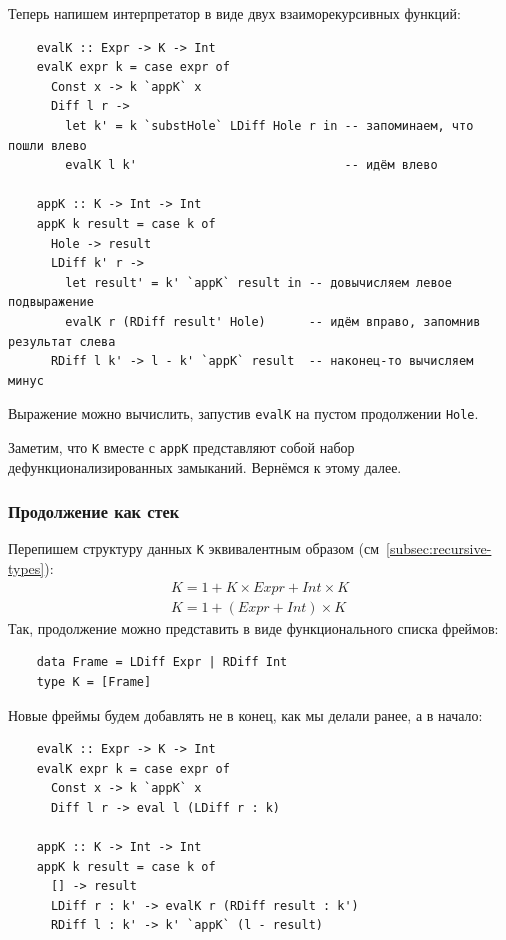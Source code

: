Теперь напишем интерпретатор в виде двух взаиморекурсивных функций:
\begin{verbatim}
    evalK :: Expr -> K -> Int
    evalK expr k = case expr of
      Const x -> k `appK` x
      Diff l r ->
        let k' = k `substHole` LDiff Hole r in -- запоминаем, что пошли влево
        evalK l k'                             -- идём влево

    appK :: K -> Int -> Int
    appK k result = case k of
      Hole -> result
      LDiff k' r ->
        let result' = k' `appK` result in -- довычисляем левое подвыражение
        evalK r (RDiff result' Hole)      -- идём вправо, запомнив результат слева
      RDiff l k' -> l - k' `appK` result  -- наконец-то вычисляем минус
\end{verbatim}

Выражение можно вычислить, запустив \texttt{evalK} на пустом продолжении \texttt{Hole}.

Заметим, что \texttt{K} вместе с \texttt{appK} представляют собой набор дефункционализированных замыканий.
Вернёмся к этому далее. %

\subsubsection{Продолжение как стек}

Перепишем структуру данных \texttt{K} эквивалентным образом (см~\ref{subsec:recursive-types}):
\[
    \begin{array}{l}
        K = 1 + K \times Expr + Int \times K \\
        K = 1 + (Expr + Int) \times K
    \end{array}
\]
Так, продолжение можно представить в виде функционального списка фреймов:
\begin{verbatim}
    data Frame = LDiff Expr | RDiff Int
    type K = [Frame]
\end{verbatim}
Новые фреймы будем добавлять не в конец, как мы делали ранее, а в начало:
\begin{verbatim}
    evalK :: Expr -> K -> Int
    evalK expr k = case expr of
      Const x -> k `appK` x
      Diff l r -> eval l (LDiff r : k)

    appK :: K -> Int -> Int
    appK k result = case k of
      [] -> result
      LDiff r : k' -> evalK r (RDiff result : k')
      RDiff l : k' -> k' `appK` (l - result)
\end{verbatim}

